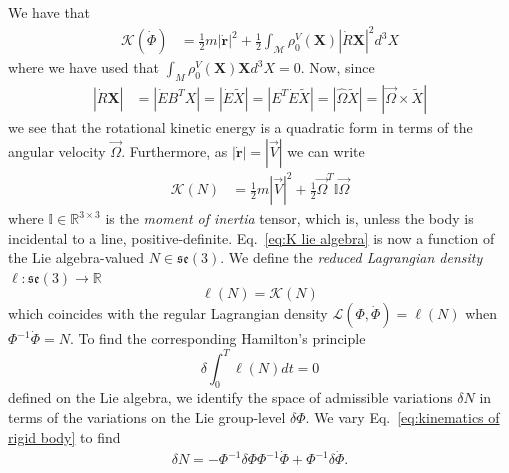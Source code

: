 We have that
\begin{equation} \label{eq:rigid body kinetic energy 2}
\begin{aligned}
\mathcal{K}(\dot{\Phi}) & = \frac{1}{2} m |\dot{\mathbf{r}}|^2 + \frac{1}{2} \int_\mathcal{M} \rho^V_0(\mathbf{X}) | \dot{R} \mathbf{X}|^2 d^3 X
\end{aligned}
\end{equation}
where we have used that $\int_M \rho^V_0(\mathbf{X}) \mathbf{X} d^3 X = 0$. Now, since
\begin{equation}
\begin{aligned}
|\dot{R} \mathbf{X}| & = |\dot{E} B^T X| = |\dot{E} \tilde{X}| = |E^T \dot{E} \tilde{X}|
= |\hat{\Omega} \tilde{X}| = |\vec{\Omega} \times \tilde{X}|
\end{aligned}
\end{equation}
we see that the rotational kinetic energy is a quadratic form in terms of the angular velocity $\vec{\Omega}$. Furthermore, as $|\dot{\mathbf{r}}| = |\vec{V}|$ we can write
\begin{equation} \label{eq:K lie algebra}
\begin{aligned}
\mathcal{K}(N) & = \frac{1}{2} m |\vec{V}|^2 + \frac{1}{2} \vec{\Omega}^T \mathbb{I} \vec{\Omega}
\end{aligned}
\end{equation}
where $\mathbb{I} \in \mathbb{R}^{3 \times 3}$ is the \textit{moment of inertia} tensor, which is, unless the body is incidental to a line, positive-definite. Eq.~\ref{eq:K lie algebra} is now a function of the Lie algebra-valued $N \in \mathfrak{se}(3)$. We define the \textit{reduced Lagrangian density} $\ell : \mathfrak{se}(3) \to \mathbb{R}$
\begin{equation}
\ell(N) = \mathcal{K}(N)
\end{equation}
which coincides with the regular Lagrangian density $\mathcal{L}(\Phi, \dot{\Phi}) = \ell(N)$ when $\Phi^{-1} \dot{\Phi} = N$. To find the corresponding Hamilton's principle
\begin{equation} \label{eq:lie algebra Hamiltons principle}
\delta \int_0^T \ell(N) dt = 0
\end{equation}
defined on the Lie algebra, we identify the space of admissible variations $\delta N$ in terms of the variations on the Lie group-level $\delta \Phi$. We vary Eq.~\ref{eq:kinematics of rigid body} to find
\begin{equation}
\begin{aligned}
\delta N = - \Phi^{-1} \delta \Phi \Phi^{-1} \dot{\Phi} + \Phi^{-1} \delta \dot{\Phi}.
\end{aligned}
\end{equation}
